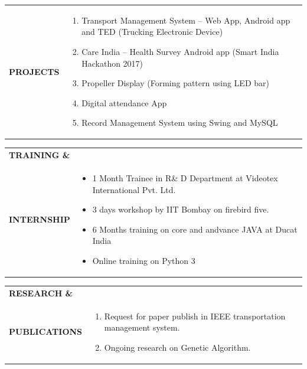 \documentclass{article}
\begin{document}
\begin{table}[h!]
    \begin{tabular}{l  p{}} 
      \textbf{\Large{PROJECTS}} & 
	\begin{enumerate}
	\item Transport Management System – Web App, Android app and TED (Trucking Electronic Device)
	\item Care India – Health Survey Android app (Smart India Hackathon 2017)
	\item Propeller Display (Forming pattern using LED bar)
	\item Digital attendance App
	\item Record Management System using Swing and MySQL
   	\end{enumerate} 
    \end{tabular}
\end{table}

\begin{table}[h!]
    \begin{tabular}{l  p{}} 
      \textbf{\Large{TRAINING \&}} \\  \textbf{\Large{INTERNSHIP}}& 
	\begin{itemize}
	\item 1 Month Trainee in R\& D Department at Videotex International Pvt. Ltd.
	\item 3 days workshop by IIT Bombay on firebird five.
	\item 6 Months training on core and andvance JAVA at Ducat India
	\item Online training on Python 3
   	\end{itemize} 
    \end{tabular}
\end{table}

\begin{table}[h!]
    \begin{tabular}{l  p{}} 
      \textbf{\Large{RESEARCH \&}} \\  \textbf{\Large{PUBLICATIONS}}& 
	\begin{enumerate}
	\item Request for paper publish in IEEE transportation management system.
	\item Ongoing research on Genetic Algorithm.
   	\end{enumerate} 
    \end{tabular}
\end{table}
\end{document}
